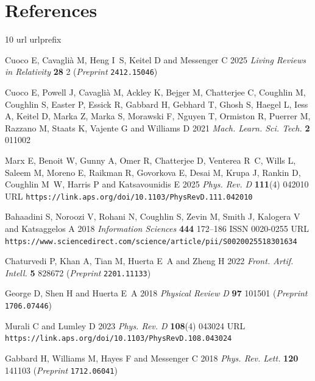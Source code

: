 \documentclass[12pt]{iopart}
\begin{document}
\section*{References}
\providecommand{\newblock}{}
\begin{thebibliography}{10}
\expandafter\ifx\csname url\endcsname\relax
  \def\url#1{{\tt #1}}\fi
\expandafter\ifx\csname urlprefix\endcsname\relax\def\urlprefix{URL }\fi
\providecommand{\eprint}[2][]{\url{#2}}

{Cuoco} E, {Cavagli{\`a}} M, {Heng} I~S, {Keitel} D and {Messenger} C 2025 {\em
  Living Reviews in Relativity\/} {\bf 28} 2 (\textit{Preprint}
  \eprint{2412.15046})

{Cuoco} E, {Powell} J, {Cavagli{\`a}} M, {Ackley} K, {Bejger} M, {Chatterjee}
  C, {Coughlin} M, {Coughlin} S, {Easter} P, {Essick} R, {Gabbard} H, {Gebhard}
  T, {Ghosh} S, {Haegel} L, {Iess} A, {Keitel} D, {Marka} Z, {Marka} S,
  {Morawski} F, {Nguyen} T, {Ormiston} R, {Puerrer} M, {Razzano} M, {Staats} K,
  {Vajente} G and {Williams} D 2021 {\em Mach. Learn. Sci. Tech.\/} {\bf 2}
  011002

Marx E, Benoit W, Gunny A, Omer R, Chatterjee D, Venterea R~C, Wills L, Saleem
  M, Moreno E, Raikman R, Govorkova E, Desai M, Krupa J, Rankin D, Coughlin
  M~W, Harris P and Katsavounidis E 2025 {\em Phys. Rev. D\/} {\bf 111}(4)
  042010 \urlprefix\url{https://link.aps.org/doi/10.1103/PhysRevD.111.042010}

Bahaadini S, Noroozi V, Rohani N, Coughlin S, Zevin M, Smith J, Kalogera V and
  Katsaggelos A 2018 {\em Information Sciences\/} {\bf 444} 172--186 ISSN
  0020-0255
  \urlprefix\url{https://www.sciencedirect.com/science/article/pii/S0020025518301634}

Chaturvedi P, Khan A, Tian M, Huerta E~A and Zheng H 2022 {\em Front. Artif.
  Intell.\/} {\bf 5} 828672 (\textit{Preprint} \eprint{2201.11133})

{George} D, {Shen} H and {Huerta} E~A 2018 {\em Physical Review D\/} {\bf 97}
  101501 (\textit{Preprint} \eprint{1706.07446})

Murali C and Lumley D 2023 {\em Phys. Rev. D\/} {\bf 108}(4) 043024
  \urlprefix\url{https://link.aps.org/doi/10.1103/PhysRevD.108.043024}

Gabbard H, Williams M, Hayes F and Messenger C 2018 {\em Phys. Rev. Lett.\/}
  {\bf 120} 141103 (\textit{Preprint} \eprint{1712.06041})


\end{thebibliography}
\end{document}
